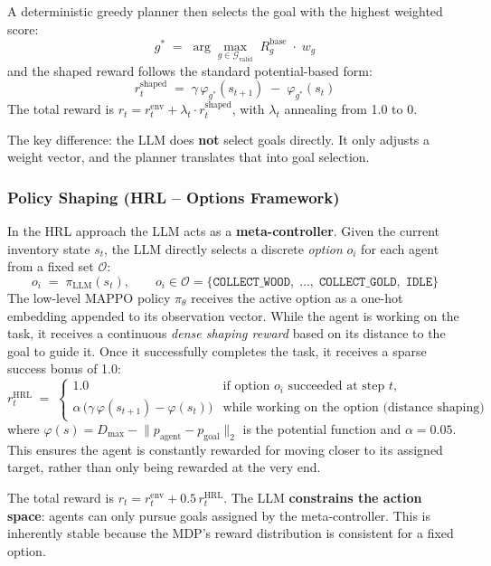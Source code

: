 \documentclass{article}
\begin{document}
A deterministic greedy planner then selects the goal with the highest weighted score:
\[
    g^* \;=\; \arg\max_{g \in \mathcal{G}_{\text{valid}}} \; R^{\text{base}}_g \;\cdot\; w_g
\]
and the shaped reward follows the standard potential-based form:
\[
    r^{\text{shaped}}_t \;=\; \gamma\,\varphi_{g^*}(s_{t+1}) \;-\; \varphi_{g^*}(s_t)
\]
The total reward is $r_t = r^{\text{env}}_t + \lambda_t \cdot r^{\text{shaped}}_t$, with $\lambda_t$ annealing from 1.0 to 0.

The key difference: the LLM does \textbf{not} select goals directly.  It only adjusts a weight vector, and the planner translates that into goal selection.

\subsubsection{Policy Shaping (HRL -- Options Framework)}

In the HRL approach the LLM acts as a \textbf{meta-controller}.
Given the current inventory state $s_t$, the LLM directly selects a discrete \emph{option} $o_i$ for each agent from a fixed set $\mathcal{O}$:
\[
    o_i \;=\; \pi_{\text{LLM}}(s_t), \qquad o_i \in \mathcal{O} = \{\texttt{COLLECT\_WOOD},\;\dots,\;\texttt{COLLECT\_GOLD},\;\texttt{IDLE}\}
\]
The low-level MAPPO policy $\pi_\theta$ receives the active option as a one-hot embedding appended to its observation vector. While the agent is working on the task, it receives a continuous \emph{dense shaping reward} based on its distance to the goal to guide it. Once it successfully completes the task, it receives a sparse success bonus of 1.0:
\[
    r^{\text{HRL}}_t \;=\;
    \begin{cases}
        1.0 & \text{if option } o_i \text{ succeeded at step } t,\\[4pt]
        \alpha\,\bigl(\gamma\,\varphi(s_{t+1}) - \varphi(s_t)\bigr) & \text{while working on the option (distance shaping)}
    \end{cases}
\]
where $\varphi(s) = D_{\max} - \lVert p_{\text{agent}} - p_{\text{goal}} \rVert_2$ is the potential function and $\alpha = 0.05$. This ensures the agent is constantly rewarded for moving closer to its assigned target, rather than only being rewarded at the very end.

The total reward is $r_t = r^{\text{env}}_t + 0.5\,r^{\text{HRL}}_t$. The LLM \textbf{constrains the action space}: agents can only pursue goals assigned by the meta-controller.  This is inherently stable because the MDP's reward distribution is consistent for a fixed option.
\end{document}
